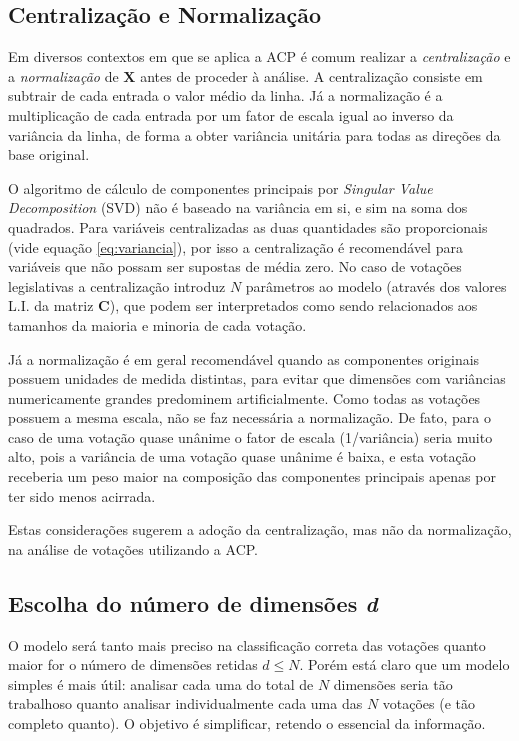 \documentclass[
	article,			%
	12pt,				%
    twoside,			%
	a4paper,			%
	english,			%
	french,				%
	spanish,			%
	brazil,				%
	]{abntex2}
\begin{document}
\subsection{Centralização e Normalização}

Em diversos contextos em que se aplica a ACP é comum realizar a \emph{centralização} e a \emph{normalização}  de $\mathbf{X}$ antes de proceder à análise. A centralização consiste em subtrair de cada entrada o valor médio da linha. Já a normalização é a multiplicação de cada entrada por um fator de escala igual ao inverso da variância da linha, de forma a obter variância unitária para todas as direções da base original.

O algoritmo de cálculo de componentes principais por \emph{Singular Value Decomposition} (SVD) não é baseado na variância em si, e sim na soma dos quadrados. Para variáveis centralizadas as duas quantidades são proporcionais (vide equação \ref{eq:variancia}), por isso a centralização é recomendável para variáveis que não possam ser supostas de média zero. No caso de votações legislativas a centralização introduz $N$ parâmetros ao modelo (através dos valores L.I. da matriz $\mathbf{C}$), que podem ser interpretados como sendo relacionados aos tamanhos da maioria e minoria de cada votação.

Já a normalização é em geral recomendável quando as componentes originais possuem unidades de medida distintas, para evitar que dimensões com variâncias numericamente grandes predominem artificialmente. Como todas as votações possuem a mesma escala, não se faz necessária a normalização. De fato, para o caso de uma votação quase unânime o fator de escala (1/variância) seria muito alto, pois a variância de uma votação quase unânime é baixa, e esta votação receberia um peso maior na composição das componentes principais apenas por ter sido menos acirrada.

Estas considerações sugerem a adoção da centralização, mas não da normalização, na análise de votações utilizando a ACP.

\subsection{Escolha do número de dimensões \emph{d}}
\label{subsec:dimensoes}

O modelo será tanto mais preciso na classificação correta das votações quanto maior for o número de dimensões retidas $d \leq N$. Porém está claro que um modelo simples é mais útil: analisar cada uma do total de $N$ dimensões seria tão trabalhoso quanto analisar individualmente cada uma das $N$ votações (e tão completo quanto). O objetivo é simplificar, retendo o essencial da informação.
\end{document}

